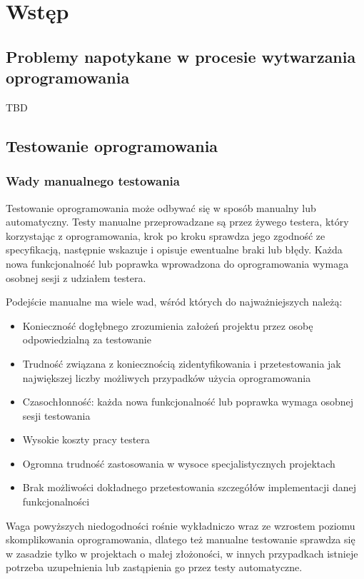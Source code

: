 \chapter[Wstęp]{Wstęp}
	\section{Problemy napotykane w procesie wytwarzania oprogramowania}
	
	  TBD
	  
	\section{Testowanie oprogramowania}
	  \subsection{Wady manualnego testowania}
  	  Testowanie oprogramowania może odbywać się w sposób manualny lub automatyczny. Testy manualne przeprowadzane są przez żywego testera, który korzystając z oprogramowania, krok po kroku sprawdza jego zgodność ze specyfikacją, następnie wskazuje i opisuje ewentualne braki lub błędy. Każda nowa funkcjonalność lub poprawka wprowadzona do oprogramowania wymaga osobnej sesji z udziałem testera. 
	  
  	  Podejście manualne ma wiele wad, wśród których do najważniejszych należą:
	  
  	  \begin{itemize}
  	    \item Konieczność dogłębnego zrozumienia założeń projektu przez osobę odpowiedzialną za testowanie
  	    \item Trudność związana z koniecznością zidentyfikowania i przetestowania jak największej liczby możliwych przypadków użycia oprogramowania
  	    \item Czasochłonność: każda nowa funkcjonalność lub poprawka wymaga osobnej sesji testowania
  	   	\item Wysokie koszty pracy testera
  	   	\item Ogromna trudność zastosowania w wysoce specjalistycznych projektach
  	   	\item Brak możliwości dokładnego przetestowania szczegółów implementacji danej funkcjonalności
  	  \end{itemize}
	  
  	  Waga powyższych niedogodności rośnie wykładniczo wraz ze wzrostem poziomu skomplikowania oprogramowania, dlatego też manualne testowanie sprawdza się w zasadzie tylko w projektach o małej złożoności, w innych przypadkach istnieje potrzeba uzupełnienia lub zastąpienia go przez testy automatyczne.
	  
